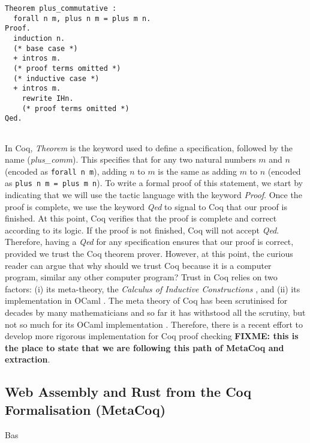 \documentclass[conference,compsoc]{IEEEtran}
\begin{document}
\begin{lstlisting}[frame=single, language=Coq, caption={Addition is Commutative},
  label={plus_comm},captionpos=t, basicstyle=\ttfamily\footnotesize,
  abovecaptionskip=-\medskipamount]
Theorem plus_commutative : 
  forall n m, plus n m = plus m n. 
Proof.
  induction n.
  (* base case *)
  + intros m.
  (* proof terms omitted *)
  (* inductive case *)  
  + intros m.
    rewrite IHn.
    (* proof terms omitted *)
Qed.
  
\end{lstlisting}

In Coq, \emph{Theorem} is the keyword used to define a specification, 
followed by the name (\emph{plus\_comm}). This specifies that for any 
two natural numbers $m$ and $n$ (encoded as \texttt{forall n m}), 
adding $n$ to $m$ is the same as adding $m$ to $n$ 
(encoded as \texttt{plus n m = plus m n}).
To write a formal proof of this statement, we start by indicating that 
we will use the tactic language with the keyword \emph{Proof}. Once the 
proof is complete, we use the keyword \emph{Qed} to signal to Coq that 
our proof is finished. At this point, Coq verifies that the proof is complete 
and correct according to its logic. If the proof is not finished, Coq will 
not accept \emph{Qed}. Therefore, having a \emph{Qed} for any specification 
ensures that our proof is correct, provided we trust the Coq theorem prover.
However, at this point, the curious reader can argue that why should we trust 
Coq because it is a computer program, similar any other computer program? 
Trust in Coq relies on two factors: (i) its meta-theory, the 
\emph{Calculus of Inductive Constructions} \cite{thierry1988calculus}, and 
(ii) its implementation in OCaml \cite{the_coq_development_team}.
The meta theory of Coq has been scrutinised for decades
by many mathematicians and so far it has withstood all 
the scrutiny, but not so much for its OCaml implementation \cite{coq_critical_bugs}. 
Therefore, there is a recent effort to develop more 
rigorous implementation for Coq proof checking \cite{10.1145/3371076} \textbf{FIXME: this is the place 
to state that we are following this path of MetaCoq and extraction}.


\subsection{Web Assembly and Rust from the Coq Formalisation (MetaCoq)}
  Bas
\end{document}
